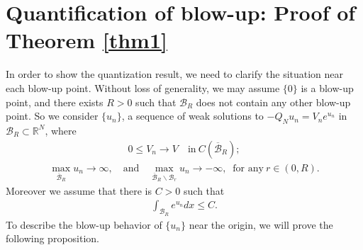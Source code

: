 \documentclass[11pt]{amsart}
\numberwithin{equation}{section}
\begin{document}
\section{Quantification of blow-up: Proof of Theorem \ref{thm1}}\label{sec4}

In order to show the quantization result, we need to clarify the situation near each blow-up point. Without loss of generality, we may assume ${\{0}\}$ is a blow-up point, and there exists $R>0$ such that $\mathcal{B}_{R}$ does not contain any other blow-up point. So we consider $\{u_{n}\}$, a sequence of weak solutions to $-Q_{N}u_{n}=V_{n}e^{u_{n}}$ in $\mathcal{B}_{R}\subset\mathbb{R}^{N}$, where
\begin{align}\label{l4.2}
0\leq V_{n}\rightarrow V \quad\mbox{in}~C(\overline{\mathcal{B}}_{R});
\end{align}
\begin{align}\label{l4.3}
\max_{\overline{\mathcal{B}}_{R}}u_{n}\rightarrow\infty, \quad \mbox{and}\quad
\max_{\overline{\mathcal{B}}_{R}\backslash \mathcal{B}_{r}}u_{n}\rightarrow-\infty, \;\;\mbox{for any}~ r\in(0,R).
\end{align}
Moreover we assume that there is $C >0$ such that
\begin{align}\label{l4.6}
\int_{\mathcal{B}_{R}}e^{u_{n}}dx\leq C.
\end{align}
To describe the blow-up behavior of $\{u_{n}\}$ near the origin, we will prove the following proposition.%
\end{document}
